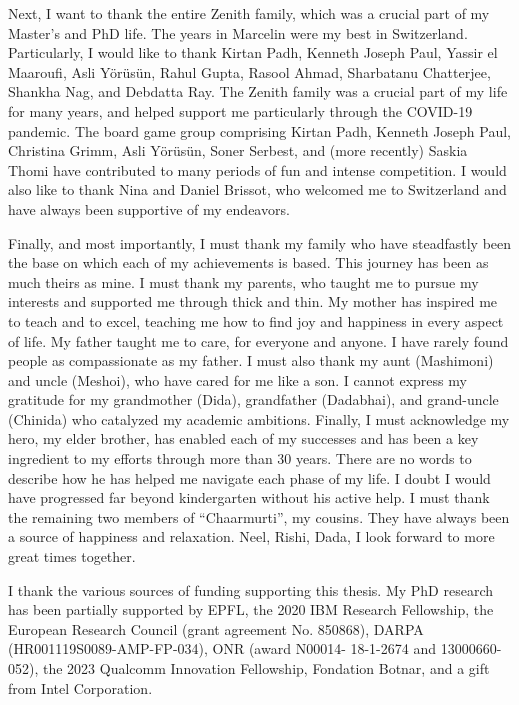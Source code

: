 Next, I want to thank the entire Zenith family, which was a crucial part of my
Master's and PhD life. 
The years in Marcelin were my best in Switzerland.
Particularly, I would like to thank Kirtan Padh, Kenneth Joseph Paul, 
Yassir el Maaroufi, Asli Yörüsün, Rahul Gupta, Rasool Ahmad, Sharbatanu Chatterjee, 
Shankha Nag, and Debdatta Ray.
The Zenith family was a crucial part of my life for many years, and helped support
me particularly through the COVID-19 pandemic.
The board game group comprising Kirtan Padh, Kenneth Joseph Paul, Christina Grimm,
Asli Yörüsün, Soner Serbest, and (more recently) Saskia Thomi have contributed to 
many periods of fun and intense competition. 
I would also like to thank Nina and Daniel Brissot, who welcomed me to Switzerland
and have always been supportive of my endeavors.

Finally, and most importantly, I must thank my family who have steadfastly been
the base on which each of my achievements is based.
This journey has been as much theirs as mine.
I must thank my parents, who taught me to pursue my interests and supported me through
thick and thin. 
My mother has inspired me to teach and to excel, teaching me how to find joy and 
happiness in every aspect of life. 
My father taught me to care, for everyone and anyone. 
I have rarely found people as compassionate as my father. 
I must also thank my aunt (Mashimoni) and uncle (Meshoi), 
who have cared for me like a son.
I cannot express my gratitude for my grandmother (Dida), grandfather (Dadabhai),
and grand-uncle (Chinida) who catalyzed my academic ambitions.
Finally, I must acknowledge my hero, my elder brother, has enabled each of my 
successes and has been a key ingredient to my efforts through more than 30 years.
There are no words to describe how he has helped me navigate each phase of my life. 
I doubt I would have progressed far beyond kindergarten without his active help.
I must thank the remaining two members of ``Chaarmurti'', my cousins.
They have always been a source of happiness and relaxation. 
Neel, Rishi, Dada, I look forward to more great times together. 

\newpage
I thank the various sources of funding supporting this thesis. 
My PhD research has been partially supported by 
EPFL, 
the 2020 IBM Research Fellowship, 
the European Research Council (grant agreement No. 850868),
DARPA (HR001119S0089-AMP-FP-034),  
ONR (award N00014- 18-1-2674 and 13000660-052),
the 2023 Qualcomm Innovation Fellowship,
Fondation Botnar, and 
a gift from Intel Corporation.

